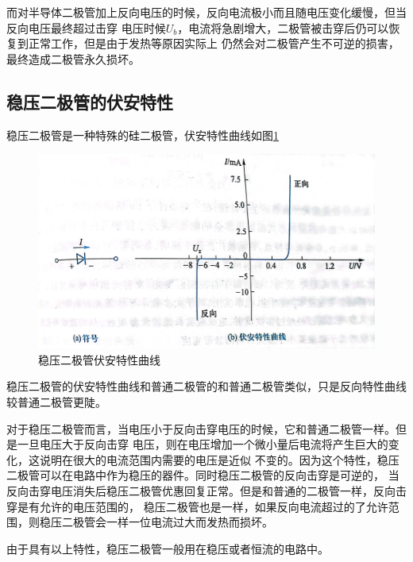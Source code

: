 \documentclass{ctexart}
\begin{document}
    而对半导体二极管加上反向电压的时候，反向电流极小而且随电压变化缓慢，但当反向电压最终超过击穿
    电压时候$U_{b}$，电流将急剧增大，二极管被击穿后仍可以恢复到正常工作，但是由于发热等原因实际上
    仍然会对二极管产生不可逆的损害，最终造成二极管永久损坏。

  \subsection{稳压二极管的伏安特性}
  稳压二极管是一种特殊的硅二极管，伏安特性曲线如图\ref{wenyafuantexing}
  \begin{figure}[tbh]
    \centering
    \includegraphics[width=1\textwidth]{wenyafuantexing.jpg}
    \caption{稳压二极管伏安特性曲线}\label{wenyafuantexing}
  \end{figure}
  稳压二极管的伏安特性曲线和普通二极管的和普通二极管类似，只是反向特性曲线较普通二极管更陡。

  对于稳压二极管而言，当电压小于反向击穿电压的时候，它和普通二极管一样。但是一旦电压大于反向击穿
  电压，则在电压增加一个微小量后电流将产生巨大的变化，这说明在很大的电流范围内需要的电压是近似
  不变的。因为这个特性，稳压二极管可以在电路中作为稳压的器件。同时稳压二极管的反向击穿是可逆的，
  当反向击穿电压消失后稳压二极管优惠回复正常。但是和普通的二极管一样，反向击穿是有允许的电压范围的，
  稳压二极管也是一样，如果反向电流超过的了允许范围，则稳压二极管会一样一位电流过大而发热而损坏。
  
  由于具有以上特性，稳压二极管一般用在稳压或者恒流的电路中。
\end{document}
